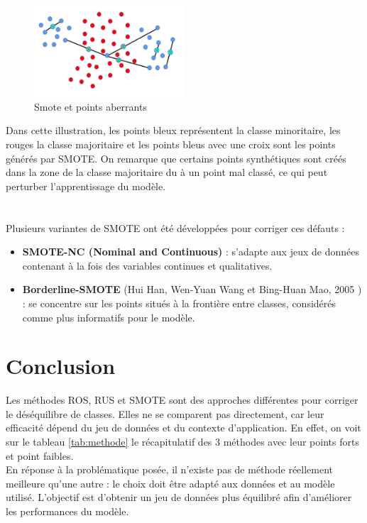\documentclass{article}
\begin{document}
\begin{figure}[h]
   \centering
   \includegraphics[width=0.50\textwidth]{images/smoteinconv.png}
   \caption{Smote et points aberrants}
   \label{fig:example2}
\end{figure}
Dans cette illustration, les points bleux représentent la classe minoritaire, les rouges la classe majoritaire et les points bleus avec une croix sont les points générés par SMOTE.
On remarque que certains points synthétiques sont créés dans la zone de la classe majoritaire du à un point mal classé, ce qui peut perturber l’apprentissage du modèle.
\\
\\
\\
Plusieurs variantes de SMOTE ont été développées pour corriger ces défauts :
\begin{itemize}
    \item \textbf{SMOTE-NC (Nominal and Continuous)} : s’adapte aux jeux de données contenant à la fois des variables continues et qualitatives.
    \item \textbf{Borderline-SMOTE} (Hui Han, Wen-Yuan Wang et Bing-Huan Mao, 2005 ) : se concentre sur les points situés à la frontière entre classes, considérés comme plus informatifs pour le modèle.
\end{itemize}

\vspace{1cm}


\section{Conclusion}

Les méthodes ROS, RUS et SMOTE sont des approches différentes pour corriger le déséquilibre de classes. Elles ne se comparent pas directement, car leur efficacité dépend du jeu de données et du contexte d’application.
En effet, on voit sur le tableau \ref{tab:methode} le récapitulatif des 3 méthodes avec leur points forts et point faibles. \\
En réponse à la problématique posée, il n’existe pas de méthode réellement meilleure qu'une autre : le choix doit être adapté aux données et au modèle utilisé.
L’objectif est d’obtenir un jeu de données plus équilibré afin d’améliorer les performances du modèle.
\\
\\
\end{document}
